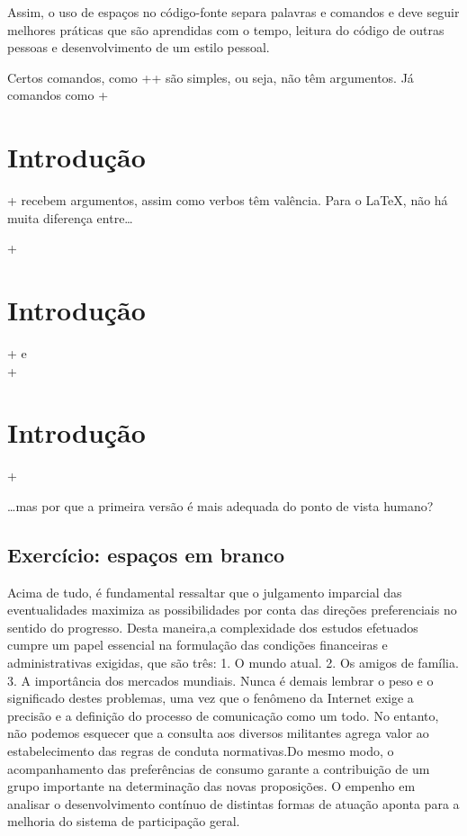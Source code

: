 \documentclass[10pt,a4paper,oneside]{article}
\newenvironment{example}
{\begin{center}\begin{examplebox}}
{\end{examplebox}\end{center}}
\begin{document}
Assim, o uso de espaços no código-fonte separa palavras e comandos e deve seguir melhores práticas que são aprendidas com o tempo, leitura do código de outras pessoas e desenvolvimento de um estilo pessoal.

Certos comandos, como \code+\tableofcontents+ são simples, ou seja, não têm argumentos. Já comandos como \code+\section{Introdução}+ recebem argumentos, assim como verbos têm valência. Para o \LaTeX, não há muita diferença entre…

\begin{example}
  \centering
  \code+\section{Introdução}+ e\\
  \code+\section {Introdução}+
\end{example}

…mas por que a primeira versão é mais adequada do ponto de vista humano?

\subsection{Exercício: espaços em branco}

Acima de tudo, é fundamental ressaltar que o julgamento imparcial das eventualidades maximiza as possibilidades por conta das direções preferenciais no sentido do progresso. Desta maneira,a complexidade dos estudos efetuados cumpre um papel essencial na formulação das condições financeiras e administrativas                       exigidas, que são três:
1. O mundo atual.
2. Os amigos de família.
3. A importância dos mercados mundiais.
Nunca é demais lembrar o peso e o significado destes problemas, uma vez que o fenômeno da Internet exige a precisão e a definição do processo de comunicação como um todo. No entanto, não podemos esquecer que                    a consulta aos diversos militantes agrega valor ao estabelecimento das regras de conduta normativas.Do mesmo modo, o acompanhamento das preferências de consumo garante a contribuição de um grupo importante na determinação das novas proposições.
O empenho em analisar o desenvolvimento contínuo de distintas formas de atuação aponta para a melhoria do sistema de participação geral.
\end{document}
